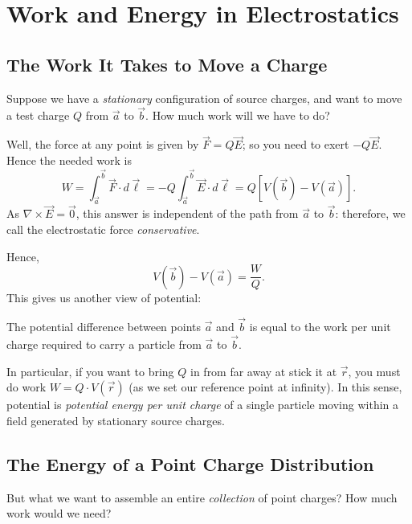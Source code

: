 \section{Work and Energy in Electrostatics}

\subsection{The Work It Takes to Move a Charge}

Suppose we have a \textit{stationary} configuration of source charges, and want to move a test charge $Q$ from $\vec{a}$ to $\vec{b}$. How much work will we have to do?

Well, the force at any point is given by $\vec{F}=Q\vec{E}$; so you need to exert $-Q\vec{E}$. Hence the needed work is
\[W=\int_{\vec{a}}^{\vec{b}}\vec{F}\cdot d\vec{\ell}=-Q\int_{\vec{a}}^{\vec{b}}\vec{E}\cdot d\vec{\ell}=Q[V(\vec{b})-V(\vec{a})].\]
As $\nabla\times \vec{E}=\vec{0}$, this answer is independent of the path from $\vec{a}$ to $\vec{b}$: therefore, we call the electrostatic force \textit{conservative}.

Hence,
\[V(\vec{b})-V(\vec{a})=\frac{W}{Q}.\]
This gives us another view of potential:
\begin{moral}
The potential difference between points $\vec{a}$ and $\vec{b}$ is equal to the work per unit charge required to carry a particle from $\vec{a}$ to $\vec{b}$.
\end{moral}
In particular, if you want to bring $Q$ in from far away at stick it at $\vec{r}$, you must do work $W=Q\cdot V(\vec{r})$ (as we set our reference point at infinity). In this sense, potential is \textit{potential energy per unit charge} of a single particle moving within a field generated by stationary source charges.

\subsection{The Energy of a Point Charge Distribution}

But what we want to assemble an entire \textit{collection} of point charges? How much work would we need?

